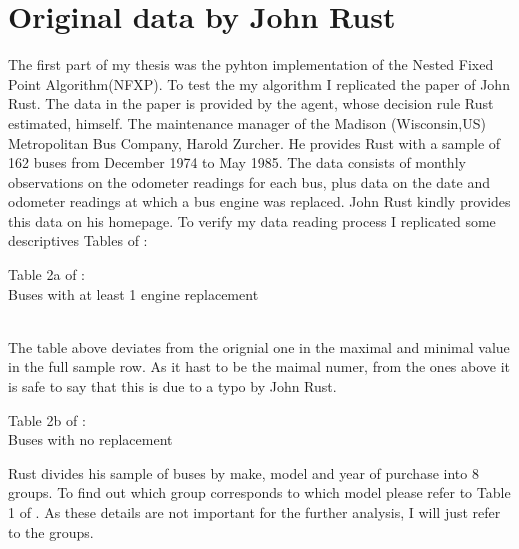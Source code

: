 \documentclass[a4paper,12pt,bold]{scrartcl}
\begin{document}
\section{Original data by John Rust}
The first part of my thesis was the pyhton implementation of the Nested Fixed Point Algorithm(NFXP). To test the my algorithm I replicated the paper of John Rust. The data in the paper is provided by the agent, whose decision rule Rust estimated, himself. The maintenance manager of the Madison (Wisconsin,US) Metropolitan Bus Company, Harold Zurcher. He provides Rust with a sample of 162 buses from December 1974 to May 1985. The data consists of monthly observations on the odometer readings for each bus, plus data on the date and odometer readings at which a bus engine was replaced. John Rust kindly provides this data on his homepage. To verify my data reading process I replicated some descriptives Tables of \cite{Rust.1987}:\\
\begin{table}
\begin{center}
  
  \caption{Table 2a of \cite{Rust.1987}: \\ Buses with at least 1 engine replacement}
\end{center}
\end{table} \\
The table above deviates from the orignial one in the maximal and minimal value in the full sample row. As it hast to be the maimal numer, from the ones above it is safe to say that this is due to a typo by John Rust. \\
\begin{table}
\begin{center}
  
  \caption{Table 2b of \cite{Rust.1987}: \\ Buses with no replacement}
\end{center}
\end{table}
Rust divides his sample of buses by make, model and year of purchase into 8 groups. To find out which group corresponds to which model please refer to Table 1 of \cite{Rust.1987}. As these details are not important for the further analysis, I will just refer to the groups.
\newpage
\end{document}
